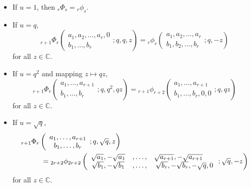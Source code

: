 \documentclass{cimart}
\newcommand{\C}{\mathbb{C}}
\begin{document}
\begin{itemize}
    \item If $u=1$, then ${}_{r}\Phi_{s}={}_{r}\phi_{s}$.
    \item If $u=q$, 
\begin{equation}
    {}_{r+1}\Phi_{r}\left(
    \begin{array}{c}
         a_{1},a_{2},\ldots,a_{r},0 \\
         b_{1},\ldots,b_{r}
    \end{array}
    ;q,q,z
    \right)={}_{r}\phi_{r}\left(
    \begin{array}{c}
         a_{1},a_{2},\ldots,a_{r} \\
         b_{1},b_{2},\ldots,b_{r}
    \end{array}
    ;q,-z
    \right)
\end{equation}
for all $z\in\C$.
\item If $u=q^2$ and mapping $z\mapsto qz$,
\begin{equation}
    {}_{r+1}\Phi_{r}\left(
    \begin{array}{c}
         a_{1},\ldots,a_{r+1} \\
         b_{1},\ldots,b_{r}
    \end{array}
    ;q,q^2,qz
    \right)={}_{r+1}\phi_{r+2}\left(
    \begin{array}{c}
         a_{1},\ldots,a_{r+1} \\
         b_{1},\ldots,b_{r},0,0
    \end{array}
    ;q,qz
    \right)
\end{equation}
for all $z\in\C$.
\item If $u=\sqrt{q}$,
\begin{align}
    &{}_{r+1}\Phi_{r}\left(
    \begin{array}{c}
         a_{1},\ldots,a_{r+1} \\
         b_{1},\ldots,b_{r}
    \end{array}
    ;q,\sqrt{q},z
    \right)\nonumber\\
    &\hspace{1cm}={}_{2r+2}\phi_{2r+2}\left(
    \begin{array}{ccc}
         \sqrt{a_{1}},-\sqrt{a_{1}}&,\ldots,&\sqrt{a_{r+1}},-\sqrt{a_{r+1}}\hspace{0.6cm}\\
         \sqrt{b_{1}},-\sqrt{b_{1}}&,\ldots,&\sqrt{b_{r}},-\sqrt{b_{r}},-\sqrt{q},0
    \end{array}
    ;\sqrt{q},-z
    \right)
\end{align}
for all $z\in\C$. 
\end{itemize}
\end{document}
